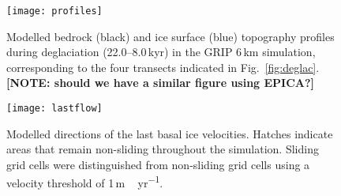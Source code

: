 \documentclass[tc, manuscript]{copernicus}
\newcommand{\note}[1]{\textbf{[NOTE: #1]}}
\begin{document}
\begin{figure}
  \texttt{[image: profiles]}
  \caption{Modelled bedrock (black) and ice surface (blue) topography profiles
           during deglaciation (22.0--8.0\,kyr) in the GRIP 6\,km
           simulation, corresponding to the four transects indicated in
           Fig.~\ref{fig:deglac}.
           \note{should we have a similar figure using EPICA?}}
  \label{fig:profiles}
\end{figure}

\begin{figure*}
  \texttt{[image: lastflow]}
  \caption{Modelled directions of the last basal ice velocities. Hatches
           indicate areas that remain non-sliding throughout the simulation.
           Sliding grid cells were distinguished from non-sliding grid cells
           using a velocity threshold of 1\,\unit{m\,yr^{-1}}.}
  \label{fig:lastflow}
\end{figure*}

\end{document}
